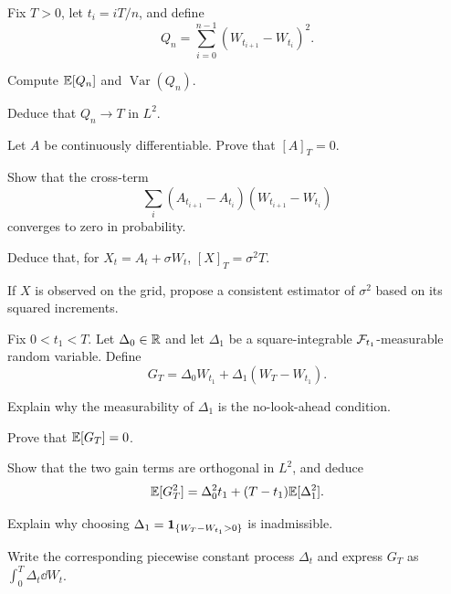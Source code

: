 \begin{exercise}
Fix \(T>0\), let \(t_i=iT/n\), and define
\[
Q_n=\sum_{i=0}^{n-1}(W_{t_{i+1}}-W_{t_i})^2.
\]
\begin{exparts}
  \item Compute \(\mathbb E[Q_n]\) and \(\operatorname{Var}(Q_n)\).
  \item Deduce that \(Q_n\to T\) in \(L^2\).
  \item Let \(A\) be continuously differentiable. Prove that \([A]_T=0\).
  \item Show that the cross-term
  \[
  \sum_i(A_{t_{i+1}}-A_{t_i})(W_{t_{i+1}}-W_{t_i})
  \]
  converges to zero in probability.
  \item Deduce that, for \(X_t=A_t+\sigma W_t\),
  \([X]_T=\sigma^2T\).
  \item If \(X\) is observed on the grid, propose a consistent estimator of
  \(\sigma^2\) based on its squared increments.
\end{exparts}
\end{exercise}

\begin{exercise}
Fix \(0<t_1<T\). Let \(\Delta_0\in\mathbb{R}\) and let \(\Delta_1\) be a
square-integrable \(\mathcal F_{t_1}\)-measurable random variable. Define
\[
G_T=\Delta_0W_{t_1}+\Delta_1(W_T-W_{t_1}).
\]
\begin{exparts}
  \item Explain why the measurability of \(\Delta_1\) is the no-look-ahead
  condition.
  \item Prove that \(\mathbb E[G_T]=0\).
  \item Show that the two gain terms are orthogonal in \(L^2\), and deduce
  \[
  \mathbb E[G_T^2]
  =\Delta_0^2t_1+(T-t_1)\mathbb E[\Delta_1^2].
  \]
  \item Explain why choosing
  \(\Delta_1=\mathbf{1}_{\{W_T-W_{t_1}>0\}}\) is inadmissible.
  \item Write the corresponding piecewise constant process \(\Delta_t\)
  and express \(G_T\) as \(\int_0^T\Delta_t\dd W_t\).
\end{exparts}
\end{exercise}
\fi

\ifIncludeFurther
{}
